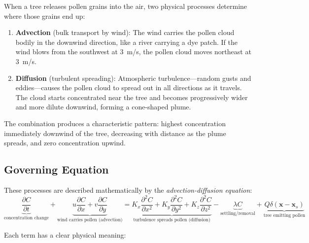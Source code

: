 \documentclass[11pt]{article}
\begin{document}
When a tree releases pollen grains into the air, two physical processes determine where those grains end up:

\begin{enumerate}
    \item \textbf{Advection} (bulk transport by wind): The wind carries the pollen cloud bodily in the downwind direction, like a river carrying a dye patch. If the wind blows from the southwest at 3~m/s, the pollen cloud moves northeast at 3~m/s.
    
    \item \textbf{Diffusion} (turbulent spreading): Atmospheric turbulence---random gusts and eddies---causes the pollen cloud to spread out in all directions as it travels. The cloud starts concentrated near the tree and becomes progressively wider and more dilute downwind, forming a cone-shaped plume.
\end{enumerate}

The combination produces a characteristic pattern: highest concentration immediately downwind of the tree, decreasing with distance as the plume spreads, and zero concentration upwind.

\subsection{Governing Equation}

These processes are described mathematically by the \emph{advection-diffusion equation}:
\begin{equation}
\underbrace{\frac{\partial C}{\partial t}}_{\text{concentration change}} + \underbrace{u\frac{\partial C}{\partial x} + v\frac{\partial C}{\partial y}}_{\text{wind carries pollen (advection)}} = \underbrace{K_x\frac{\partial^2 C}{\partial x^2} + K_y\frac{\partial^2 C}{\partial y^2} + K_z\frac{\partial^2 C}{\partial z^2}}_{\text{turbulence spreads pollen (diffusion)}} - \underbrace{\lambda C}_{\text{settling/removal}} + \underbrace{Q\delta(\mathbf{x}-\mathbf{x}_s)}_{\text{tree emitting pollen}}
\label{eq:advdiff}
\end{equation}

Each term has a clear physical meaning:
\end{document}
